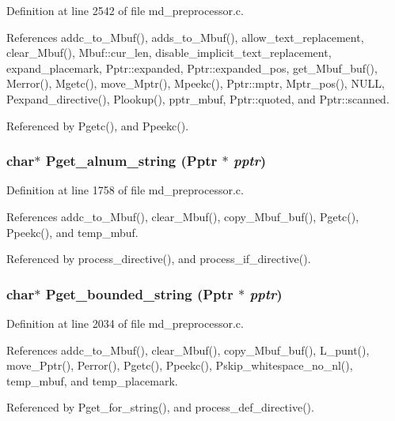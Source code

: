 Definition at line 2542 of file md\_\-preprocessor.c.

References addc\_\-to\_\-Mbuf(), adds\_\-to\_\-Mbuf(), allow\_\-text\_\-replacement, clear\_\-Mbuf(), Mbuf::cur\_\-len, disable\_\-implicit\_\-text\_\-replacement, expand\_\-placemark, Pptr::expanded, Pptr::expanded\_\-pos, get\_\-Mbuf\_\-buf(), Merror(), Mgetc(), move\_\-Mptr(), Mpeekc(), Pptr::mptr, Mptr\_\-pos(), NULL, Pexpand\_\-directive(), Plookup(), pptr\_\-mbuf, Pptr::quoted, and Pptr::scanned.

Referenced by Pgetc(), and Ppeekc().
\subsubsection{\setlength{\rightskip}{0pt plus 5cm}char$\ast$ Pget\_\-alnum\_\-string (\bf{Pptr} $\ast$ {\em pptr})}\label{md__preprocessor_8h_c229bcda9d9321b3abe143a15e46b6ac}




Definition at line 1758 of file md\_\-preprocessor.c.

References addc\_\-to\_\-Mbuf(), clear\_\-Mbuf(), copy\_\-Mbuf\_\-buf(), Pgetc(), Ppeekc(), and temp\_\-mbuf.

Referenced by process\_\-directive(), and process\_\-if\_\-directive().
\subsubsection{\setlength{\rightskip}{0pt plus 5cm}char$\ast$ Pget\_\-bounded\_\-string (\bf{Pptr} $\ast$ {\em pptr})}\label{md__preprocessor_8h_dc875874dad3e9abb6cb02d654e5e897}




Definition at line 2034 of file md\_\-preprocessor.c.

References addc\_\-to\_\-Mbuf(), clear\_\-Mbuf(), copy\_\-Mbuf\_\-buf(), L\_\-punt(), move\_\-Pptr(), Perror(), Pgetc(), Ppeekc(), Pskip\_\-whitespace\_\-no\_\-nl(), temp\_\-mbuf, and temp\_\-placemark.

Referenced by Pget\_\-for\_\-string(), and process\_\-def\_\-directive().

